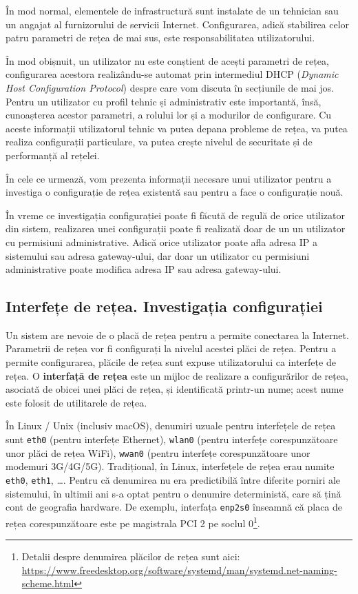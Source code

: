 În mod normal, elementele de infrastructură sunt instalate de un tehnician sau un angajat al furnizorului de servicii Internet.
Configurarea, adică stabilirea celor patru parametri de rețea de mai sus, este responsabilitatea utilizatorului.

În mod obișnuit, un utilizator nu este conștient de acești parametri de rețea, configurarea acestora realizându-se automat prin intermediul DHCP  (\textit{Dynamic Host Configuration Protocol}) despre care vom discuta în secțiunile de mai jos.
Pentru un utilizator cu profil tehnic și administrativ este importantă, însă, cunoașterea acestor parametri, a rolului lor și a modurilor de configurare.
Cu aceste informații utilizatorul tehnic va putea depana probleme de rețea, va putea realiza configurații particulare, va putea crește nivelul de securitate și de performanță al rețelei.

În cele ce urmează, vom prezenta informații necesare unui utilizator pentru a investiga o configurație de rețea existentă sau pentru a face o configurație nouă.

În vreme ce investigația configurației poate fi făcută de regulă de orice utilizator din sistem, realizarea unei configurații poate fi realizată doar de un un utilizator cu permisiuni administrative.
Adică orice utilizator poate afla adresa IP a sistemului sau adresa gateway-ului, dar doar un utilizator cu permisiuni administrative poate modifica adresa IP sau adresa gateway-ului.

\subsection{Interfețe de rețea. Investigația configurației}
\label{sec:net:config:interface}

Un sistem are nevoie de o placă de rețea pentru a permite conectarea la Internet.
Parametrii de rețea vor fi configurați la nivelul acestei plăci de rețea.
Pentru a permite configurarea, plăcile de rețea sunt expuse utilizatorului ca interfețe de rețea.
O \textbf{interfață de rețea} este un mijloc de realizare a configurărilor de rețea, asociată de obicei unei plăci de rețea, și identificată printr-un nume;
acest nume este folosit de utilitarele de rețea.

În Linux / Unix (inclusiv macOS), denumiri uzuale pentru interfețele de rețea sunt \texttt{eth0} (pentru interfețe Ethernet), \texttt{wlan0} (pentru interfețe corespunzătoare unor plăci de rețea WiFi), \texttt{wwan0} (pentru interfețe corespunzătoare unor modemuri 3G/4G/5G).
Tradițional, în Linux, interfețele de rețea erau numite \texttt{eth0}, \texttt{eth1}, \ldots.
Pentru că denumirea nu era predictibilă între diferite porniri ale sistemului, în ultimii ani s-a optat pentru o denumire deterministă, care să țină cont de geografia hardware.
De exemplu, interfața \texttt{enp2s0} înseamnă că placa de rețea corespunzătoare este pe magistrala PCI 2 pe soclul 0\footnote{Detalii despre denumirea plăcilor de rețea sunt aici: \url{https://www.freedesktop.org/software/systemd/man/systemd.net-naming-scheme.html}}.

